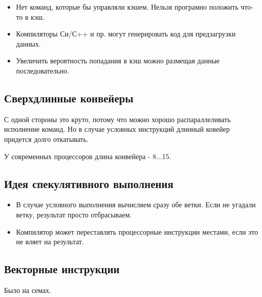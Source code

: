 \begin{itemize}
	\item Нет команд, которые бы управляли кэшем. Нельзя програмно положить 
	что-то в кэш.
	\item Компиляторы Си/С++ и пр. могут генерировать код для предзагрузки данных.
	\item Увеличить вероятность попадания в кэш можно размещая данные последовательно.
\end{itemize}

\subsection{Сверхдлинные конвейеры}

С одной стороны это круто, потому что можно хорошо распараллеливать исполнение команд.
Но в случае условных инструкций длинный ковейер придется долго откатывать.

У современных процессоров длина конвейера - 8...15. 

\subsection{Идея спекулятивного выполнения}

\begin{itemize}
	\item В случае условного выполнения вычисляем сразу обе ветки. Если не угадали ветку, результат просто отбрасываем.
	\item Компилятор может переставлять процессорные инструкции местами, если это не
	вляет на результат.
\end{itemize}

\subsection{Векторные инструкции}

 Было на семах.








